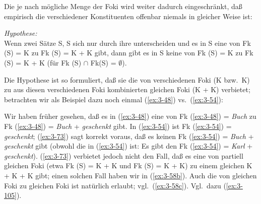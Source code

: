 \documentclass[output=paper]{langsci/langscibook}
\begin{document}
Die je nach  mögliche Menge der Foki wird weiter dadurch
eingeschränkt, daß empirisch die  verschiedener Konstituenten
offenbar niemals in gleicher Weise  ist:
\begin{exe}
	\ex \label{ex:3-73}
\textit{Hypothese:} \\
Wenn zwei Sätze S, S sich nur durch ihre 
unterscheiden und es in S eine  von Fk (S)
= K zu Fk (S) = K + K gibt, dann gibt es in S
keine  von Fk (S) = K zu Fk (S) = K
+ K (für Fk (S) $\cap$ Fk(S) = $\emptyset$).
\end{exe}
Die Hypothese ist so formuliert, daß sie die  von
verschiedenen Foki (K bzw.\ K) zu aus diesen verschiedenen Foki
kombinierten gleichen Foki (K + K) verbietet; betrachten wir
als Beispiel dazu noch einmal (\ref{ex:3-48}) vs.\ (\ref{ex:3-54}):
\begin{exe}
\end{exe}
Wir haben früher gesehen, daß es in (\ref{ex:3-48}) eine  von
Fk (\ref{ex:3-48}) = \textit{Buch} zu Fk (\ref{ex:3-48}) = \textit{Buch} +
\textit{geschenkt} gibt. In (\ref{ex:3-54}) ist Fk (\ref{ex:3-54}) = \textit{geschenkt};
(\ref{ex:3-73}) sagt korrekt voraus, daß es keinen Fk (\ref{ex:3-54}) = \textit{Buch} +
\textit{geschenkt} gibt (obwohl die  in (\ref{ex:3-54}) 
ist: Es gibt den Fk (\ref{ex:3-54}) = \textit{Karl} +
\textit{geschenkt}). (\ref{ex:3-73}) verbietet jedoch nicht den Fall, daß es eine
 von partiell gleichen Foki (etwa Fk (S) = K +
K und Fk (S) = K + K) zu einem gleichen 
K + K + K gibt; einen solchen Fall haben wir in (\ref{ex:3-58b}). Auch die  von gleichen Foki zu gleichen Foki ist
natürlich erlaubt; vgl.\ (\ref{ex:3-58c}). Vgl.\ dazu (\ref{ex:3-105}).
\end{document}

